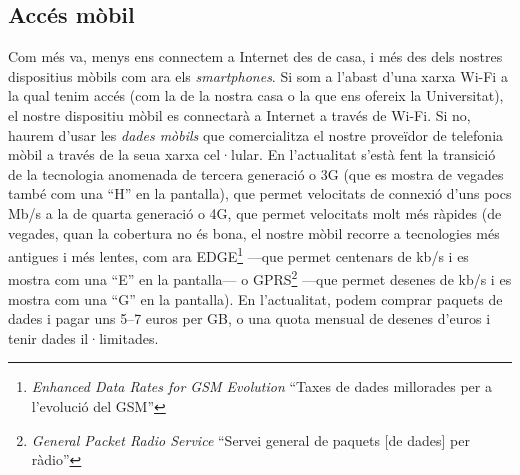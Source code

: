 \subsection{Accés mòbil}
Com més va, menys ens connectem a Internet des de casa, i més des dels
nostres dispositius mòbils com ara els \emph{smartphones}. Si som a
l'abast d'una xarxa Wi-Fi a la qual tenim accés (com la de la nostra
casa o la que ens ofereix la Universitat), el nostre dispositiu mòbil
es connectarà a Internet a través de Wi-Fi. Si no, haurem d'usar les
\emph{dades mòbils} que comercialitza el nostre proveïdor de telefonia
mòbil a través de la seua xarxa cel·lular. En l'actualitat s'està fent
la transició de la tecnologia anomenada de tercera generació o 3G (que
es mostra de vegades també com una ``H'' en la pantalla), que permet
velocitats de connexió d'uns pocs Mb/s a la de quarta generació o 4G,
que permet velocitats molt més ràpides (de vegades, quan la cobertura
no és bona, el nostre mòbil recorre a tecnologies més antigues i més
lentes, com ara EDGE\footnote{\emph{Enhanced Data Rates for GSM
    Evolution} ``Taxes de dades millorades per a l'evolució del GSM''}
---que permet centenars de kb/s i es mostra com una ``E'' en la
pantalla--- o GPRS\footnote{\emph{General Packet Radio Service} ``Servei
  general de paquets [de dades] per ràdio''} ---que permet desenes de
kb/s i es mostra com una ``G'' en la pantalla). En l'actualitat, podem
comprar paquets de dades i pagar uns 5--7 euros per GB, o una quota
mensual de desenes d'euros i tenir dades il·limitades.

